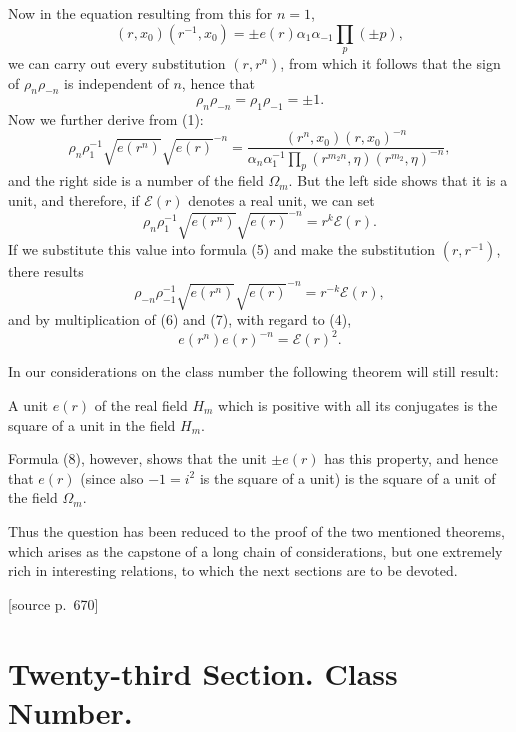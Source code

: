 \documentclass[11pt]{article}
\newcommand{\srcpage}[1]{\par\medskip\noindent\textsf{[source p.~#1]}\par\smallskip}
\begin{document}
Now in the equation resulting from this for $n=1$,
\[
(r,x_0)(r^{-1},x_0)=\pm e(r)\alpha_1\alpha_{-1}\prod_p(\pm p),
\]
we can carry out every substitution $(r,r^n)$, from which it follows that the sign of $\rho_n\rho_{-n}$ is independent of $n$, hence that
\begin{equation}
\rho_n\rho_{-n}=\rho_1\rho_{-1}=\pm1.
\tag{4}
\end{equation}
Now we further derive from (1):
\begin{equation}
\rho_n\rho_1^{-1}\sqrt{e(r^n)}\sqrt{e(r)}^{-n}=\frac{(r^n,x_0)(r,x_0)^{-n}}{\alpha_n\alpha_1^{-1}\prod_p(r^{m_2n},\eta)(r^{m_2},\eta)^{-n}},
\tag{5}
\end{equation}
and the right side is a number of the field $\Omega_m$. But the left side shows that it is a unit, and therefore, if $\mathscr E(r)$ denotes a real unit, we can set
\begin{equation}
\rho_n\rho_1^{-1}\sqrt{e(r^n)}\sqrt{e(r)}^{-n}=r^k\mathscr E(r).
\tag{6}
\end{equation}
If we substitute this value into formula (5) and make the substitution $(r,r^{-1})$, there results
\begin{equation}
\rho_{-n}\rho_{-1}^{-1}\sqrt{e(r^n)}\sqrt{e(r)}^{-n}=r^{-k}\mathscr E(r),
\tag{7}
\end{equation}
and by multiplication of (6) and (7), with regard to (4),
\begin{equation}
e(r^n)e(r)^{-n}=\mathscr E(r)^2.
\tag{8}
\end{equation}

In our considerations on the class number the following theorem will still result:
\begin{center}
A unit $e(r)$ of the real field $H_m$ which is positive with all its conjugates is the square of a unit in the field $H_m$.
\end{center}
Formula (8), however, shows that the unit $\pm e(r)$ has this property, and hence that $e(r)$ (since also $-1=i^2$ is the square of a unit) is the square of a unit of the field $\Omega_m$.

Thus the question has been reduced to the proof of the two mentioned theorems, which arises as the capstone of a long chain of considerations, but one extremely rich in interesting relations, to which the next sections are to be devoted.

\srcpage{670}
\section*{Twenty-third Section. Class Number.}
\end{document}
